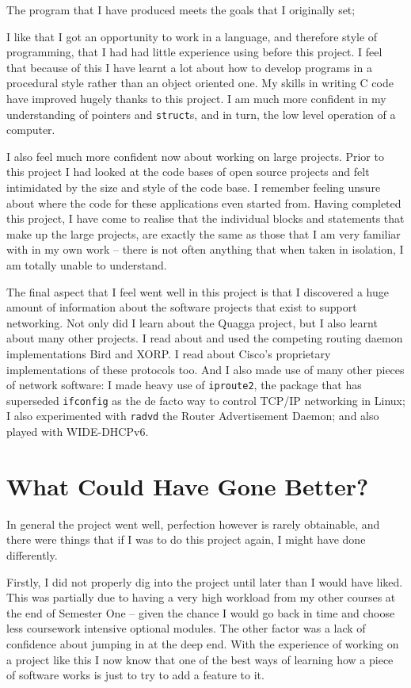 \documentclass[12pt]{report}
\begin{document}
The program that I have produced meets the goals that I originally set; 

I like that I got an opportunity to work in a language, and therefore style of
programming, that I had had little experience using before this project.  I
feel that because of this I have learnt a lot about how to develop programs in
a procedural style rather than an object oriented one. My skills in writing C
code have improved hugely thanks to this project. I am much more confident in
my understanding of pointers and \texttt{struct}s, and in turn, the low level
operation of a computer.  

I also feel much more confident now about working on large projects. Prior to
this project I had looked at the code bases of open source projects and felt
intimidated by the size and style of the code base. I remember feeling unsure
about where the code for these applications even started from. Having completed
this project, I have come to realise that the individual blocks and statements
that make up the large projects, are exactly the same as those that I am very
familiar with in my own work -- there is not often anything that when taken in
isolation, I am totally unable to understand.

The final aspect that I feel went well in this project is that I discovered a
huge amount of information about the software projects that exist to support
networking. Not only did I learn about the Quagga project, but I also learnt
about many other projects. I read about and used the competing routing daemon
implementations Bird and XORP\@. I read about Cisco's proprietary implementations of
these protocols too. And I also made use of many other pieces of network
software: I made heavy use of \texttt{iproute2}, the package that has
superseded \texttt{ifconfig} as the de facto way to control TCP/IP networking
in Linux; I also experimented with \texttt{radvd} the Router Advertisement
Daemon; and also played with WIDE-DHCPv6. 

\section{What Could Have Gone Better?}
In general the project went well, perfection however is rarely obtainable, and
there were things that if I was to do this project again, I might have done
differently. 

Firstly, I did not properly dig into the project until later than I would have
liked.  This was partially due to having a very high workload from my other
courses at the end of Semester One -- given the chance I would go back in time
and choose less coursework intensive optional modules. The other factor was a
lack of confidence about jumping in at the deep end. With the experience of
working on a project like this I now know that one of the best ways of learning
how a piece of software works is just to try to add a feature to it.
\end{document}
